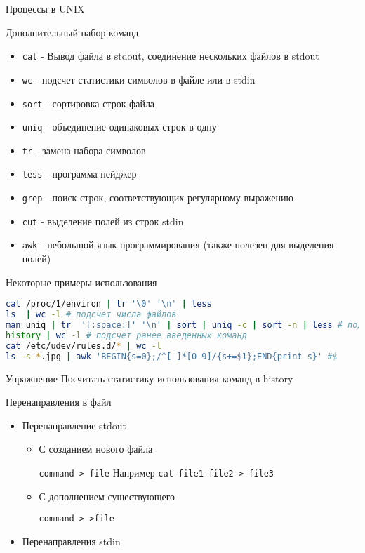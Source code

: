 \documentclass[ignorenonframetext, professionalfonts, hyperref={pdftex, unicode}]{beamer}
\begin{document}
\begin{frame}{Процессы в UNIX}
\begin{frame}{Дополнительный набор команд}
 \begin{itemize}
  \item {\tt cat} - Вывод файла в stdout, соединение нескольких файлов в stdout
  \item {\tt wc} - подсчет статистики символов в файле или в stdin 
  \item {\tt sort} - сортировка строк файла
  \item {\tt uniq} - объединение одинаковых строк в одну
  \item {\tt tr} - замена набора символов
  \item {\tt less} - программа-пейджер
  \item {\tt grep} - поиск строк, соответствующих регулярному выражению
  \item {\tt cut} - выделение полей из строк stdin
  \item {\tt awk} - небольшой язык программирования (также полезен для выделения полей)
 \end{itemize}
\end{frame}
\begin{frame}[fragile]{Некоторые примеры использования}
\begin{lstlisting}[language=bash]
cat /proc/1/environ | tr '\0' '\n' | less
ls  | wc -l # подсчет числа файлов
man uniq | tr  '[:space:]' '\n' | sort | uniq -c | sort -n | less # подсчет количества слов в тексте man uniq
history | wc -l # подсчет ранее введенных команд
cat /etc/udev/rules.d/* | wc -l
ls -s *.jpg | awk 'BEGIN{s=0};/^[ ]*[0-9]/{s+=$1};END{print s}' #$
\end{lstlisting}
\pause
\begin{block}{Упражнение}
Посчитать статистику использования команд в history
\end{block}
\end{frame}

\begin{frame}{Перенаправления в файл}
\begin{itemize}
\item Перенаправление stdout 
\begin{itemize}
\item С созданием нового файла

{\tt command > file} Например {\tt cat file1 file2 > file3}
\item С дополнением существующего

{\tt command > >file}
\end{itemize}
\pause
\item Перенаправления stdin


\end{itemize}
\end{frame}
\end{frame}
\end{document}
